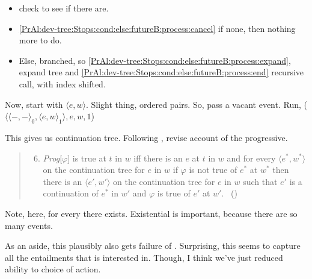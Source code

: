 \begin{note}
\begin{itemize}
\begin{itemize}
\begin{itemize}
        \begin{itemize}
        \item
          \label{PrAl:dev-tree:Stops:cond:else:futureB:process:start} check to see if there are.
        \item 
          \autoref{PrAl:dev-tree:Stops:cond:else:futureB:process:cancel} if none, then nothing more to do.
        \item
          Else, branched, so \autoref{PrAl:dev-tree:Stops:cond:else:futureB:process:expand}, expand tree and \autoref{PrAl:dev-tree:Stops:cond:else:futureB:process:end} recursive call, with index shifted.
        \end{itemize}
      \end{itemize}
    \end{itemize}
  \end{itemize}
  Now, start with \(\langle e,w \rangle\).
  Slight thing, ordered pairs.
  So, pass a vacant event.
  Run, \AlgDevelopTree{}(\(\langle \langle -,- \rangle_{0}, \langle e,w \rangle_{1} \rangle, e, w, 1\))
\end{note}

\begin{note}
  This gives us continuation tree.
  Following \citeauthor{Szabo:2004ul}, revise account of the progressive.

  \begin{quote}
    \begin{enumerate}[label=(\Roman*), ref=(\Roman*)]
      \setcounter{enumi}{5}
    \item
      \emph{Prog}[\(\varphi\)] is true at \(t\) in \(w\) iff there is an \(e\) at \(t\) in \(w\) and for every \(\langle e^{\ast}, w^{\ast} \rangle\) on the continuation tree for \(e\) in \(w\) if \(\varphi\) is not true of \(e^{\ast}\) at \(w^{\ast}\) then there is an \(\langle e', w' \rangle\) on the continuation tree for \(e\) in \(w\) such that \(e'\) is a continuation of \(e^{\ast}\) in \(w'\) and \(\varphi\) is true of \(e'\) at \(w'\).%
      \mbox{ }\hfill\mbox{(\citeyear[37]{Szabo:2004ul})}
    \end{enumerate}
  \end{quote}

  Note, here, for every there exists.
  Existential is important, because there are so many events.

  As an aside, this plausibly also gets failure of \BoyVS{}.
  Surprising, this seems to capture all the entailments that \citeauthor{Boylan:2020aa} is interested in.
  Though, I think we've just reduced ability to choice of action.
\end{note}

